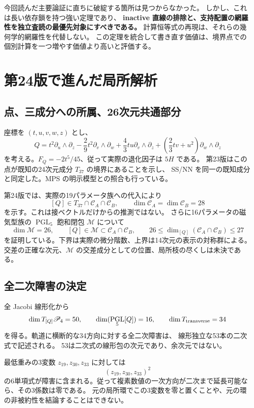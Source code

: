 \documentclass[11pt,a4paper]{ltjsarticle}
\newcommand{\cP}{\mathscr P_4}\newcommand{\OO}{\mathcal O}
\DeclareMathOperator{\PGL}{PGL}\DeclareMathOperator{\GL}{GL}
\theoremstyle{remark}\newtheorem{remark}[proposition]{注意}
\begin{document}
今回読んだ主要論証に直ちに破綻する箇所は見つからなかった。
しかし、これは長い依存鎖を持つ強い定理であり、
\textbf{inactive 直線の排除と、支持配置の網羅性を独立査読の最優先対象にすべきである。}
計算恒等式の再現は、それらの幾何学的網羅性を代替しない。
この定理を統合して書き直す価値は、境界点での個別計算を一つ増やす価値より高いと評価する。

\section{第24版で進んだ局所解析}

\subsection{点、三成分への所属、26次元共通部分}

座標を $(t,u,v,w,z)$ とし、
\[
 Q=t^2\partial_u\wedge\partial_z
 -\frac29t^2\partial_v\wedge\partial_w
 +\frac43tu\partial_v\wedge\partial_z
 +\left(\frac23tv+u^2\right)\partial_w\wedge\partial_z
\]
を考える。$F_Q=-2t^5/45$、従って実際の退化因子は $5H$ である。
第23版はこの点が既知の24次元成分 $T_{37}$ の境界にあることを示し、
SS/NN を同一の既知成分と同定した。MPS の明示模型との照合も行っている\cite{MPSquantum}。

第24版では、実際の19パラメータ族への代入により
\[
 [Q]\in T_{37}\cap\mathcal C_A\cap\mathcal C_B,
 \qquad \dim\mathcal C_A=\dim\mathcal C_B=28
\]
を示す。これは接ベクトルだけからの推測ではない。
さらに16パラメータの磁気型族の $\PGL_5$ 飽和閉包 $\mathcal M$ について
\[
 \dim\mathcal M=26,\qquad
 [Q]\in\mathcal M\subset\mathcal C_A\cap\mathcal C_B,
 \qquad26\leq\dim_{[Q]}(\mathcal C_A\cap\mathcal C_B)\leq27
\]
を証明している。下界は実際の微分階数、上界は14次元の表示の対称群による。
交差の正確な次元、$\mathcal M$ の交差成分としての位置、局所枝の尽くしは未決である。

\subsection{全二次障害の決定}

全 Jacobi 線形化から
\[
 \dim T_{[Q]}\cP=50,\qquad
 \dim(\PGL_5[Q])=16,
 \qquad \dim T_{\rm transverse}=34
\]
を得る。軌道に横断的な34方向に対する全二次障害は、
線形独立な53本の二次式で記述される。
53は二次式の線形包の次元であり、余次元ではない。

最低重みの3変数 $z_{19},z_{30},z_{33}$ に対しては
\[
 (z_{19},z_{30},z_{33})^2
\]
の6単項式が障害に含まれる。従って複素数値の一次方向が二次まで延長可能なら、その3係数は零である。
元の局所環でこの3変数を零と置くことや、元の環の非被約性を結論することはできない。
\end{document}
